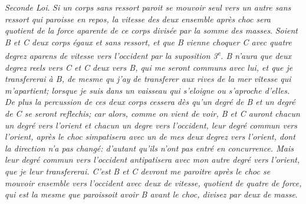 %
%
\textit{Seconde Loi}.
\pend
%
\pstart\noindent
%
\textit{Si un corps sans ressort\protect{} paroit se mouvoir seul vers un autre sans ressort\protect{} qui paroisse en repos, la vitesse des deux ensemble après}
%
%
\textit{choc sera}
%
%
\textit{quotient de la force aparente\protect{} de ce corps divisée par la somme des masses}. 
\pend
\newpage
\pstart
\textit{Soient \textit{B} et \textit{C} deux corps égaux et sans ressort,\protect{} et que \textit{B} vienne choquer \textit{C}
%
avec quatre degrez aparens de vitesse vers l'occident par la suposition 3\textsuperscript{e}.
%
\textit{B} n'aura que deux degrez reels vers \textit{C} et \textit{C} deux vers \textit{B}, qui me seront
%
communs avec lui, et que je transfererai à \textit{B}, de mesme qu j'ay}
%
%
\textit{de transferer aux rives de la mer}
%
%
\textit{vîtesse qui m'apartient; lorsque je suis dans un vaisseau\protect{} qui s'eloigne ou s'aproche d'elles. 
%
De plus la percussion\protect{} de ces deux corps cessera dès qu'un degré de \textit{B} et un degré de \textit{C} 
%
se seront reflechis; car alors, comme on vient de voir, \textit{B} et \textit{C} auront chacun un degré 
%
vers l'orient et chacun un degre vers l'occident, leur degré commun vers l'orient, après le choc\protect{} simpatisera
%
avec un de mes deux degrez vers l'orient, dont la direction n'a pas changé: d'autant qu'ils n'ont pas entré 
%
en concurrence. Mais leur degré commun vers l'occident antipatisera avec mon autre degré vers l'orient, 
%
que je leur transfererai. C'est}
%
%
\textit{\textit{B} et \textit{C} devront me paroitre après le choc\protect{} se mouvoir ensemble vers l'occident avec 
%
deux de vitesse, quotient de quatre de force, qui est la mesme que paroissoit avoir \textit{B} 
%
avant le choc,\protect{} divisez par deux de masse}. 
